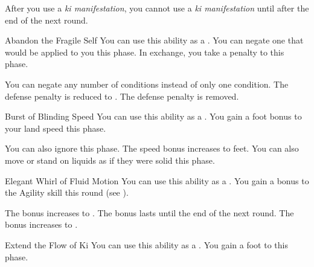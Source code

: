        After you use a \textit{ki manifestation}, you cannot use a \textit{ki manifestation} until after the end of the next round.
        {
            \begin{durationability}{Abandon the Fragile Self}
                \rankline
                You can use this ability as a .
                You can negate one  that would be applied to you this phase.
                In exchange, you take a  penalty to  this phase.

                \rankline
                 You can negate any number of conditions instead of only one condition.
                 The defense penalty is reduced to .
                 The defense penalty is removed.
            \end{durationability}

            \begin{durationability}{Burst of Blinding Speed}
                \rankline
                You can use this ability as a .
                You gain a  foot bonus to your land speed this phase.

                \rankline
                 You can also ignore  this phase.
                 The speed bonus increases to  feet.
                 You can also move or stand on liquids as if they were solid this phase.
            \end{durationability}

            \begin{durationability}{Elegant Whirl of Fluid Motion}
                \rankline
                You can use this ability as a .
                You gain a  bonus to the Agility skill this round (see ).

                \rankline
                 The bonus increases to .
                 The bonus lasts until the end of the next round.
                 The bonus increases to .
            \end{durationability}

            \begin{durationability}{Extend the Flow of Ki}
                \rankline
                You can use this ability as a .
                You gain a  foot  to  this phase.


\end{durationability}}
